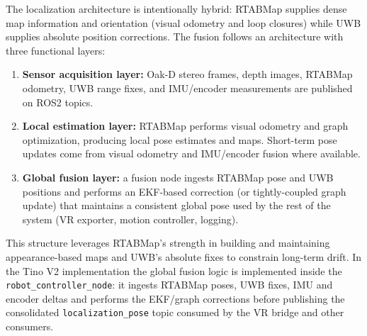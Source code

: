 The localization architecture is intentionally hybrid: RTABMap supplies dense map information and orientation (visual odometry and loop closures) while UWB supplies absolute position corrections. The fusion follows an architecture with three functional layers:

\begin{enumerate}
	\item \textbf{Sensor acquisition layer:} Oak‑D stereo frames, depth images, RTABMap odometry, UWB range fixes, and IMU/encoder measurements are published on ROS2 topics.
	\item \textbf{Local estimation layer:} RTABMap performs visual odometry and graph optimization, producing local pose estimates and maps. Short-term pose updates come from visual odometry and IMU/encoder fusion where available.
	\item \textbf{Global fusion layer:} a fusion node ingests RTABMap pose and UWB positions and performs an EKF-based correction (or tightly-coupled graph update) that maintains a consistent global pose used by the rest of the system (VR exporter, motion controller, logging).
\end{enumerate}

This structure leverages RTABMap's strength in building and maintaining appearance-based maps and UWB's absolute fixes to constrain long-term drift. In the Tino V2 implementation the global fusion logic is implemented inside the \texttt{robot\_controller\_node}: it ingests RTABMap poses, UWB fixes, IMU and encoder deltas and performs the EKF/graph corrections before publishing the consolidated \texttt{localization\_pose} topic consumed by the VR bridge and other consumers.

